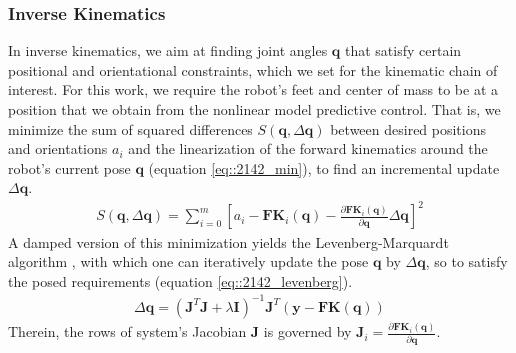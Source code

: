 \subsubsection{Inverse Kinematics}
\label{sec::2142_ik}
In inverse kinematics, we aim at finding joint angles $\bm{q}$ that satisfy certain positional and orientational constraints, which we set for the kinematic chain of interest. For this work, we require the robot's feet and center of mass to be at a position that we obtain from the nonlinear model predictive control. That is, we minimize the sum of squared differences $S(\bm{q},\Delta\bm{q})$ between desired positions and orientations $a_i$ and the linearization of the forward kinematics around the robot's current pose $\bm{q}$ (equation \ref{eq::2142_min}), to find an incremental update $\Delta\bm{q}$. 
\begin{align}
	S(\bm{q},\Delta\bm{q}) = \sum_{i=0}^m\left[a_i-\textbf{FK}_i(\bm{q})-\frac{\partial\textbf{FK}_i(\bm{q})}{\partial\bm{q}}\Delta\bm{q}\right]^2
	\label{eq::2142_min}
\end{align}
A damped version of this minimization yields the Levenberg-Marquardt algorithm \cite{more1978levenberg}\cite{sugihara2011solvability}, with which one can iteratively update the pose $\bm{q}$ by $\Delta\bm{q}$, so to satisfy the posed requirements (equation \ref{eq::2142_levenberg}).
\begin{align}
	\Delta\bm{q} = (\bm{J}^T\bm{J}+\lambda\bm{I})^{-1}\bm{J}^T(\bm{y}-\textbf{FK}(\bm{q}))
	\label{eq::2142_levenberg}
\end{align}
Therein, the rows of system's Jacobian $\bm{J}$ is governed by $\bm{J}_i=\frac{\partial\textbf{FK}_i(\bm{q})}{\partial\bm{q}}$.